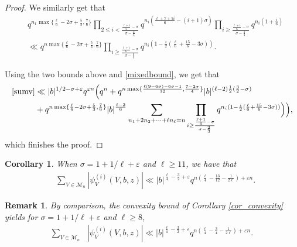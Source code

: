 \documentclass[12pt]{amsart}
\newtheorem{corollary}[theorem]{Corollary}
\newtheorem{remark}[theorem]{Remark}
\begin{document}
\begin{proof}
We similarly get that
\begin{align*}
& q^{n_1 \max\{ \frac{\ell}{6}-2\sigma+\frac{5}{3}, \frac{7}{6} \}}  \prod_{2 \leq i< \frac{ \frac{\ell+1}{6} -\sigma}{\sigma-\frac{2}{3}}} q^{n_i ( \frac{\ell+7+5i}{6}-(i+1)\sigma)} \prod_{i \geq  \frac{ \frac{\ell+1}{6} -\sigma}{\sigma-\frac{2}{3}}} q^{n_i (1+\frac{i}{6})} \\
& \ll q^{n \max\{ \frac{\ell}{6}-2\sigma+\frac{5}{3}, \frac{7}{6} \}} \prod_{i \geq  \frac{ \frac{\ell+1}{6} -\sigma}{\sigma-\frac{2}{3}}} q^{n_i (1-\frac{i}{2} ( \frac{\ell}{6} +\frac{15}{6}-3\sigma))}.
\end{align*}

Using the two bounds above and \eqref{mixedbound}, we get that
\begin{align*}
\eqref{sumv} & \ll |b|^{1/2-\sigma+\varepsilon} q^{\varepsilon n} \Big(q^n +q^{ n \max\{ \frac{\ell(9-6\sigma)-6\sigma-1}{12} , \frac{7-2\sigma}{4} \}} |b|^{(\ell-2)\frac{1}{2} (\frac{3}{2}-\sigma)}\\
& +q^{n \max\{ \frac{\ell}{6}-2\sigma+\frac{5}{3}, \frac{7}{6} \}} |b|^{\frac{\ell-2}{6}} \sum_{n_1+2n_2+\cdots+\ell n_{\ell}=n}  \prod_{i \geq  \frac{ \frac{\ell+1}{6} -\sigma}{\sigma-\frac{2}{3}}} q^{n_i (1-\frac{i}{2} ( \frac{\ell}{6} +\frac{15}{6}-3\sigma))}  \Big) \Big),
\end{align*}
which finishes the proof.
 \end{proof}

\begin{corollary}
\label{lov_sigma}
When $\sigma=1+1/\ell+\varepsilon$ and $\ell \geq 11$, we have that
\begin{align*}
&\sum_{V \in \mathcal{M}_n}  |\psi^{(i)}_V(V,b,z)| \ll   |b|^{\frac{\ell}{4}-\frac{3}{2}+\varepsilon}   q^{n ( \frac{\ell}{4} - \frac{13}{12} - \frac{1}{2\ell} )+\varepsilon n}.
\end{align*}
\end{corollary}


 \begin{remark}
 By comparison,  the convexity bound of Corollary \ref{cor_convexity} yields for  $\sigma=1+1/\ell+\varepsilon$  and  $\ell\geq 8$,
 \begin{align*}
\sum_{V \in \mathcal{M}_n} & |\psi^{(i)}_V(V,b,z)| \ll |b|^{\frac{\ell}{4}-\frac{3}{2}+\varepsilon}   q^{n(\frac{\ell}{4}-\frac{3}{4}-\frac{1}{2\ell})+\varepsilon n}.
\end{align*}
                       \end{remark}
\end{document}
